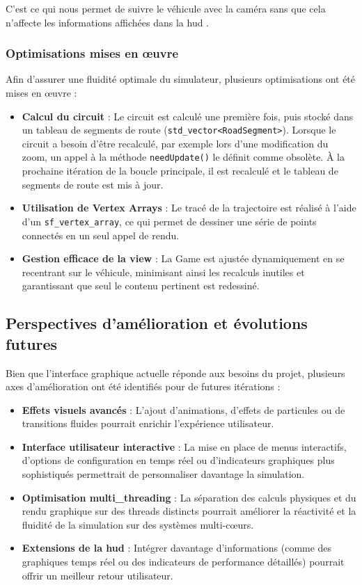 C'est ce qui nous permet de suivre le véhicule avec la \og caméra \fg{} sans que cela n'affecte les informations affichées dans la \gls{hud} .

\subsubsection{Optimisations mises en œuvre}\label{subsubsec:optimisations-mises-en-oeuvre}
Afin d'assurer une fluidité optimale du simulateur, plusieurs optimisations ont été mises en œuvre :
\begin{itemize}
    \item \textbf{Calcul du circuit} : Le circuit est calculé une première fois, puis stocké dans un tableau de segments de route (\texttt{\gls{std_vector}<RoadSegment>}\cite{cpp_reference_vector}).
    Lorsque le circuit a besoin d'être recalculé, par exemple lors d'une modification du zoom, un appel à la méthode \texttt{needUpdate()} le définit comme obsolète.
    À la prochaine itération de la boucle principale, il est recalculé et le tableau de segments de route est mis à jour.
    \item \textbf{Utilisation de Vertex Arrays} : Le tracé de la trajectoire est réalisé à l'aide d'un \texttt{\gls{sf_vertex_array}}\cite{sfml_sf_vertexarray}, ce qui permet de dessiner une série de points connectés en un seul appel de rendu.
    \item \textbf{Gestion efficace de la \gls{view}} : La Game  est ajustée dynamiquement en se recentrant sur le véhicule, minimisant ainsi les recalculs inutiles et garantissant que seul le contenu pertinent est redessiné.
\end{itemize}

\subsection{Perspectives d'amélioration et évolutions futures}\label{subsec:perspectives-d-evolution}
Bien que l'interface graphique actuelle réponde aux besoins du projet, plusieurs axes d'amélioration ont été identifiés pour de futures itérations :
\begin{itemize}
    \item \textbf{Effets visuels avancés} : L'ajout d'animations, d'effets de particules ou de transitions fluides pourrait enrichir l'expérience utilisateur.
    \item \textbf{Interface utilisateur interactive} : La mise en place de menus interactifs, d'options de configuration en temps réel ou d'indicateurs graphiques plus sophistiqués permettrait de personnaliser davantage la simulation.
    \item \textbf{Optimisation \gls{multi_threading}} : La séparation des calculs physiques et du rendu graphique sur des threads distincts pourrait améliorer la réactivité et la fluidité de la simulation sur des systèmes multi-cœurs.
    \item \textbf{Extensions de la \gls{hud} } : Intégrer davantage d'informations (comme des graphiques temps réel ou des indicateurs de performance détaillés) pourrait offrir un meilleur retour utilisateur.
\end{itemize}
